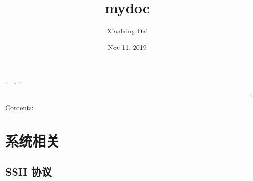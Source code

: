 \documentclass[a4paper,10pt,english]{sphinxmanual}
\title{mydoc}
\date{Nov 11, 2019}
\author{Xiaolaing Dai}
\begin{document}
\ifdefined\shorthandoff
  \ifnum\catcode`\=\string=\active\shorthandoff{=}\fi
  \ifnum\catcode`\"=\active{}\fi
\fi

\pagestyle{empty}
\sphinxmaketitle
\pagestyle{plain}
\sphinxtableofcontents
\pagestyle{normal}
\label{\detokenize{index::doc}}

\bigskip\hrule\bigskip


Contents:




\chapter{系统相关}
\label{\detokenize{linux/shell:id1}}\label{\detokenize{linux/shell::doc}}

\section{SSH 协议}
\end{document}
